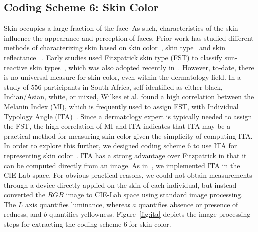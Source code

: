 \documentclass[letterpaper,11pt]{article}
\begin{document}
\subsection{Coding Scheme 6: Skin Color}

Skin occupies a large fraction of the face.  As such, characteristics of the skin influence the appearance and perception of faces.  Prior work has studied different methods of characterizing skin based on skin color~\cite{ita_ijcs1991,takiwaki98,wang15}, skin type~\cite{ita_ijcs1991,Fitzpatrick88} and skin reflectance ~\cite{weyrich06}.  Early studies used Fitzpatrick skin type (FST) to classify sun-reactive skin types~\cite{Fitzpatrick88}, which was also adopted recently in~\cite{gendershades_FAT18}.  However, to-date, there is no universal measure for skin color, even within the dermatology field.  In a study of $556$ participants in South Africa, self-identified as either black, Indian/Asian, white, or mixed, Wilkes et al. found a high correlation between the Melanin Index (MI), which is frequently used to assign FST, with Individual Typology Angle (ITA)~\cite{wilkes15}.  Since a dermatology expert is typically needed to assign the FST, the high correlation of MI and ITA indicates that ITA may be a practical method for measuring skin color given the simplicity of computing ITA. In order to explore this further, we designed coding scheme 6 to use ITA for representing skin color~\cite{ita_ijcs1991}.  ITA has a strong advantage over Fitzpatrick in that it can be computed directly from an image.  As in~\cite{ita_ijcs1991}, we implemented ITA in the CIE-Lab space. For obvious practical reasons, we could not obtain measurements through a device directly applied on the skin of each individual, but instead converted the $RGB$ image to CIE-Lab space using standard image processing. The $L$ axis quantifies luminance, whereas $a$ quantifies absence or presence of redness, and $b$ quantifies yellowness.  Figure~\ref{fig:ita} depicts the image processing steps for extracting the coding scheme 6 for skin color.
\end{document}
